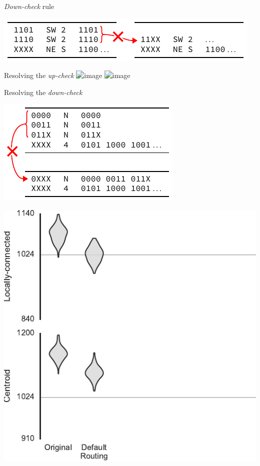 \documentclass[t]{beamer}
\begin{document}
\begin{frame}{\emph{Down-check} rule}
  \begin{center}
    \includegraphics{figures/rule2b_example}
  \end{center}
\end{frame}

\begin{frame}{Resolving the \emph{up-check}}
  \includegraphics<1>{figures/upcheck_resolve_example_1}
  \includegraphics<2>{figures/upcheck_resolve_example_2}
\end{frame}

\begin{frame}{Resolving the \emph{down-check}}
  \begin{center}
    \includegraphics{figures/downcheck_resolve_example_1}
  \end{center}
\end{frame}

\begin{frame}[plain]{}
  \begin{center}
    \includegraphics[page=5]{experiments/presentation_plots}
  \end{center}
\end{frame}
\end{document}
